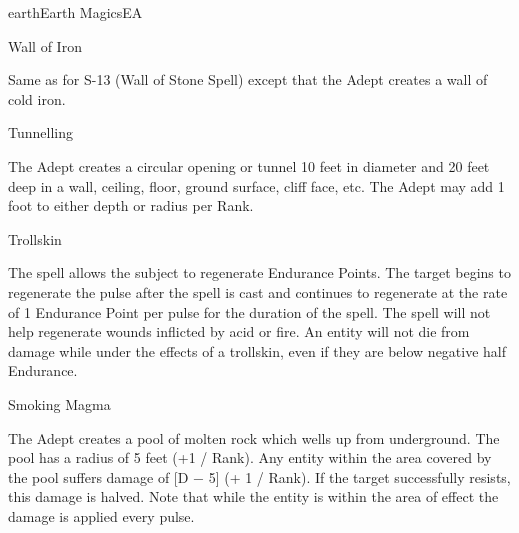 \begin{College}[1.2]{earth}{Earth Magics}{EA}
\begin{spell}[S-14]{Wall of Iron}

\begin{effects}
Same as for S-13 (Wall of Stone Spell) except that the Adept creates a
wall of cold iron.
\end{effects}
\end{spell}

\begin{spell}[S-15]{Tunnelling}

\begin{effects}
The Adept creates a circular opening or tunnel 10 feet in diameter and
20 feet deep in a wall, ceiling, floor, ground surface, cliff face,
etc.  The Adept may add 1 foot to either depth or radius per Rank.
\end{effects}
\end{spell}

\begin{spell}[S-16]{Trollskin}

\begin{effects}
The spell allows the subject to regenerate Endurance Points.  The
target begins to regenerate the pulse after the spell is cast and
continues to regenerate at the rate of 1 Endurance Point per pulse for
the duration of the spell.  The spell will not help regenerate wounds
inflicted by acid or fire.  An entity will not die from damage while
under the effects of a trollskin, even if they are below negative half
Endurance.
\end{effects}
\end{spell}

\begin{spell}[S-17]{Smoking Magma}

\begin{effects}
The Adept creates a pool of molten rock which wells up from
underground.  The pool has a radius of 5 feet (+1 / Rank).  Any entity
within the area covered by the pool suffers damage of [D − 5] (+ 1 /
Rank).  If the target successfully resists, this damage is halved.
Note that while the entity is within the area of effect the damage is
applied every pulse.
\end{effects}
\end{spell}


\end{College}
